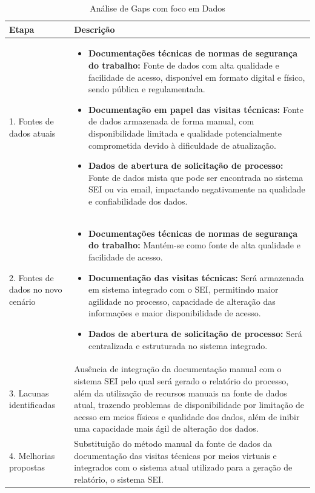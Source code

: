 \documentclass[12pt,a4paper]{article}
\begin{document}
\begin{table}[htbp]
\centering
\begin{tcolorbox}[enhanced, colback=white, colframe=gray!40, arc=3mm, boxrule=0.5pt, width=0.85\linewidth]
\begin{tabular}{|p{2cm}|p{10cm}|}
\hline
\rowcolor{gray!20}
\textbf{Etapa} & \textbf{Descrição} \\
\hline
1. Fontes de dados atuais & \begin{itemize}\setlength{\itemsep}{0pt}
\item \textbf{Documentações técnicas de normas de segurança do trabalho:} Fonte de dados com alta qualidade e facilidade de acesso, disponível em formato digital e físico, sendo pública e regulamentada.
\item \textbf{Documentação em papel das visitas técnicas:} Fonte de dados armazenada de forma manual, com disponibilidade limitada e qualidade potencialmente comprometida devido à dificuldade de atualização.
\item \textbf{Dados de abertura de solicitação de processo:} Fonte de dados mista que pode ser encontrada no sistema SEI ou via email, impactando negativamente na qualidade e confiabilidade dos dados.
\end{itemize} \\
\hline
2. Fontes de dados no novo cenário & \begin{itemize}\setlength{\itemsep}{0pt}
\item \textbf{Documentações técnicas de normas de segurança do trabalho:} Mantém-se como fonte de alta qualidade e facilidade de acesso.
\item \textbf{Documentação das visitas técnicas:} Será armazenada em sistema integrado com o SEI, permitindo maior agilidade no processo, capacidade de alteração das informações e maior disponibilidade de acesso.
\item \textbf{Dados de abertura de solicitação de processo:} Será centralizada e estruturada no sistema integrado.
\end{itemize} \\
\hline
3. Lacunas identificadas & Ausência de integração da documentação manual com o sistema SEI pelo qual será gerado o relatório do processo, além da utilização de recursos manuais na fonte de dados atual, trazendo problemas de disponibilidade por limitação de acesso em meios físicos e qualidade dos dados, além de inibir uma capacidade mais ágil de alteração dos dados. \\
\hline
4. Melhorias propostas & Substituição do método manual da fonte de dados da documentação das visitas técnicas por meios virtuais e integrados com o sistema atual utilizado para a geração de relatório, o sistema SEI. \\
\hline
\end{tabular}
\end{tcolorbox}
\caption{Análise de Gaps com foco em Dados}
\end{table}
\end{document}
